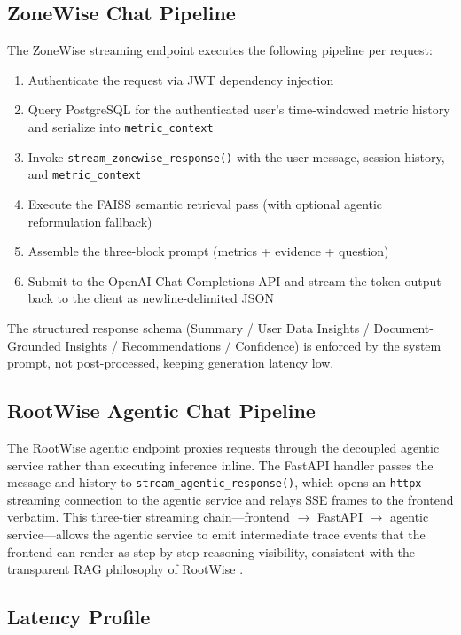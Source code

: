 \documentclass[11pt,twocolumn]{article}
\begin{document}
\subsection{ZoneWise Chat Pipeline}

The ZoneWise streaming endpoint executes the following pipeline per request:

\begin{enumerate}
    \item Authenticate the request via JWT dependency injection
    \item Query PostgreSQL for the authenticated user's time-windowed metric history and serialize into \texttt{metric\_context}
    \item Invoke \texttt{stream\_zonewise\_response()} with the user message, session history, and \texttt{metric\_context}
    \item Execute the FAISS semantic retrieval pass (with optional agentic reformulation fallback)
    \item Assemble the three-block prompt (metrics + evidence + question)
    \item Submit to the OpenAI Chat Completions API and stream the token output back to the client as newline-delimited JSON
\end{enumerate}

The structured response schema (Summary / User Data Insights / Document-Grounded Insights / Recommendations / Confidence) is enforced by the system prompt, not post-processed, keeping generation latency low.

\subsection{RootWise Agentic Chat Pipeline}

The RootWise agentic endpoint proxies requests through the decoupled agentic service rather than executing inference inline. The FastAPI handler passes the message and history to \texttt{stream\_agentic\_response()}, which opens an \texttt{httpx} streaming connection to the agentic service and relays SSE frames to the frontend verbatim. This three-tier streaming chain—frontend $\to$ FastAPI $\to$ agentic service—allows the agentic service to emit intermediate trace events that the frontend can render as step-by-step reasoning visibility, consistent with the transparent RAG philosophy of RootWise \cite{faris2025rootwise}.

\subsection{Latency Profile}
\end{document}
